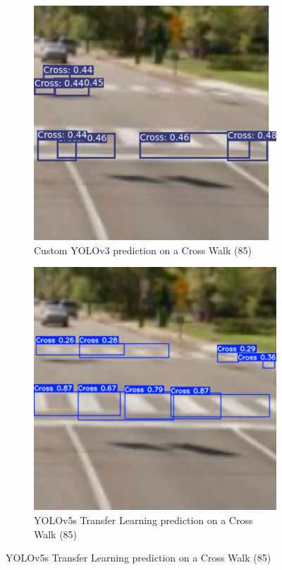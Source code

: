 \documentclass{article}
\begin{document}
\begin{figure}[htbp]
  \centering
  \begin{subfigure}[\textwidth]
    \centering
    \includegraphics[width=\linewidth]{Cross (85)_nms.png}
    \caption{Custom YOLOv3 prediction on a Cross Walk (85)}
    \label{fig:cross_nms}
  \end{subfigure}
  \hfill
  \begin{subfigure}[\textwidth]
    \centering
    \includegraphics[width=\linewidth]{Cross (85)_tl.png}
    \caption{YOLOv5s Transfer Learning prediction on a Cross Walk (85)}
    \label{fig:cross_tl}
  \end{subfigure}
  \label{fig:cross_comparison}
\end{figure}
\end{document}
